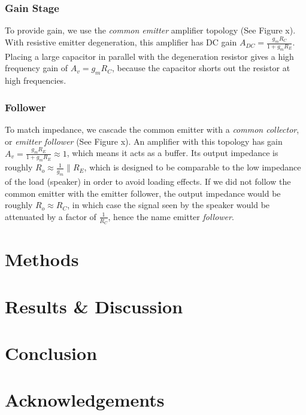 \documentclass[11pt]{article}
\begin{document}
        \subsubsection{Gain Stage}
        To provide gain, we use the \emph{common emitter} amplifier topology (See Figure x). With resistive emitter degeneration, this amplifier has DC gain $A_{DC} = \frac{g_m R_C}{1 + g_m R_E}$. Placing a large capacitor in parallel with the degeneration resistor gives a high frequency gain of $A_v = g_m R_C$, because the capacitor shorts out the resistor at high frequencies.
        
        \subsubsection{Follower}
        To match impedance, we cascade the common emitter with a \emph{common collector}, or \emph{emitter follower} (See Figure x). An amplifier with this topology has gain $A_v = \frac{g_m R_E}{1 + g_m R_E} \approx 1$, which means it acts as a buffer. Its output impedance is roughly $R_o \approx \frac{1}{g_m} \parallel R_E$, which is designed to be comparable to the low impedance of the load (speaker) in order to avoid loading effects. If we did not follow the common emitter with the emitter follower, the output impedance would be roughly $R_o \approx R_C$, in which case the signal seen by the speaker would be attenuated by a factor of $\frac{1}{R_C}$, hence the name emitter \emph{follower}.

\section{Methods}

\section{Results \& Discussion}

\section{Conclusion}

\section{Acknowledgements}
\end{document}
